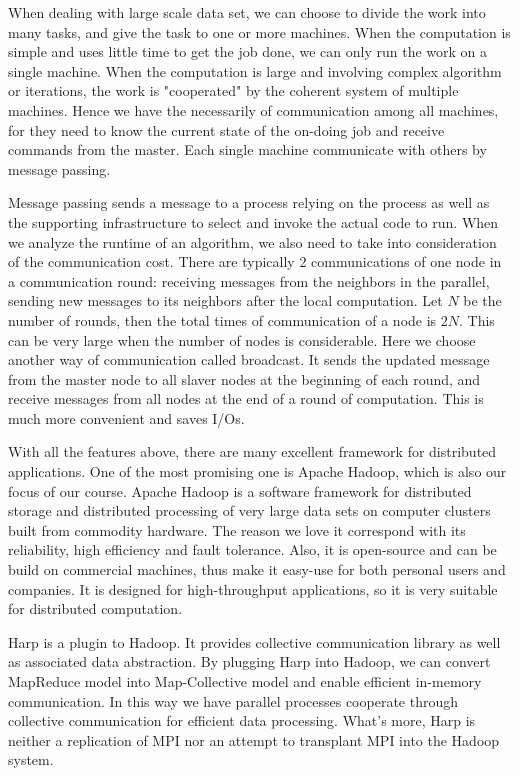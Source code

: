 When dealing with large scale data set, we can choose to divide the work into many tasks, and give the task to one or more machines. When the computation is simple and uses little time to get the job done, we can only run the work on a single machine. When the computation is large and involving complex algorithm or iterations, the work is "cooperated" by the coherent system of multiple machines. Hence we have the necessarily of communication among all machines, for they need to know the current state of the on-doing job and receive commands from the master. Each single machine communicate with others by message passing.

Message passing sends a message to a process relying on the process as well as the supporting infrastructure to select and invoke the actual code to run. When we analyze the runtime of an algorithm, we also need to take into consideration of the communication cost. There are typically 2 communications of one node in a communication round: receiving messages from the neighbors in the parallel, sending new messages to its neighbors after the local computation. Let $N$ be the number of rounds, then the total times of communication of a node is $2N$. This can be very large when the number of nodes is considerable. Here we choose another way of communication called broadcast. It sends the updated message from the master node to all slaver nodes at the beginning of each round, and receive messages from all nodes at the end of a round of computation. This is much more convenient and saves I/Os.

With all the features above, there are many excellent framework for distributed applications. One of the most promising one is Apache Hadoop\cite{white2012hadoop}, which is also our focus of our course. Apache Hadoop is a software framework for distributed storage and distributed processing of very large data sets on computer clusters built from commodity hardware. The reason we love it correspond with its reliability, high efficiency and fault tolerance. Also, it is open-source and can be build on commercial machines, thus make it easy-use for both personal users and companies. It is designed for high-throughput applications, so it is very suitable for distributed computation.

Harp\cite{zhang2015harp} is a plugin to Hadoop. It provides collective communication library as well as associated data abstraction. By plugging Harp into Hadoop, we can convert MapReduce model into Map-Collective model and enable efficient in-memory communication. In this way we have parallel processes cooperate through collective communication for efficient data processing. What's more, Harp is neither a replication of MPI nor an attempt to transplant MPI into the Hadoop system.


